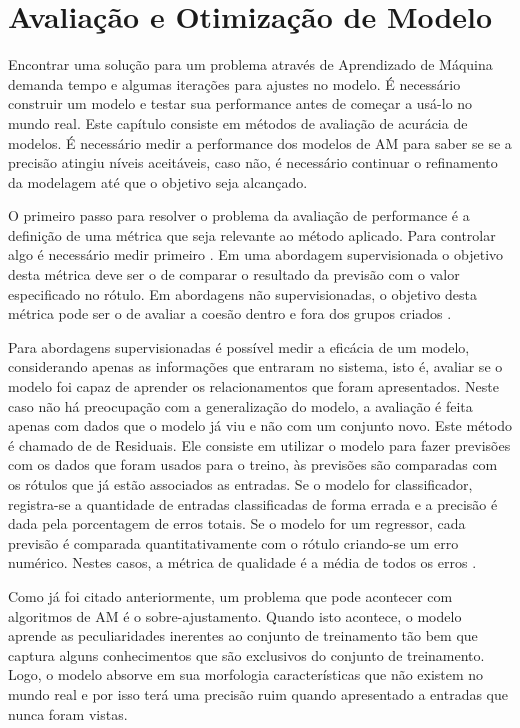 \section{Avaliação e Otimização de Modelo}

Encontrar uma solução para um problema através de Aprendizado de Máquina demanda tempo e algumas iterações para ajustes no modelo. É necessário construir um modelo e testar sua performance antes de começar a usá-lo no mundo real. Este capítulo consiste em métodos  de avaliação de acurácia de modelos. É necessário medir a performance dos modelos de AM para saber se se a precisão atingiu níveis aceitáveis, caso não, é necessário continuar o refinamento da modelagem até que o objetivo seja alcançado. 

O primeiro passo para resolver o problema da avaliação de performance é a definição de uma métrica que seja relevante ao método aplicado. Para controlar algo é necessário medir primeiro \cite{hjames2014}. Em uma abordagem supervisionada o objetivo desta métrica deve ser o de comparar o resultado da previsão com o valor especificado no rótulo. Em abordagens não supervisionadas, o objetivo desta métrica pode ser o de avaliar a coesão dentro e fora dos grupos criados \cite{scikit2014}. 

Para abordagens supervisionadas é possível medir a eficácia de um modelo, considerando apenas as informações que entraram no sistema, isto é, avaliar se o modelo foi capaz de aprender os relacionamentos que foram apresentados. Neste caso não há preocupação com a generalização do modelo, a avaliação é feita apenas com dados que o modelo já viu e não com um conjunto novo. Este método é chamado de de Residuais. Ele consiste em utilizar o modelo para fazer previsões com os dados que foram usados para o treino, às previsões são comparadas com os rótulos que já estão associados as entradas. Se o modelo for classificador, registra-se a quantidade de entradas classificadas de forma errada e a precisão é dada pela porcentagem de erros totais. Se o modelo for um regressor, cada previsão é comparada quantitativamente com o rótulo criando-se um erro numérico. Nestes casos, a métrica de qualidade é a média de todos os erros \cite{jeff1997}. 

Como já foi citado anteriormente, um problema que pode acontecer com algoritmos de AM é o sobre-ajustamento. Quando isto acontece, o modelo aprende as peculiaridades inerentes ao conjunto de treinamento tão bem que captura alguns conhecimentos que são exclusivos do conjunto de treinamento. 
Logo, o modelo absorve em sua morfologia características que não existem no mundo real e por isso terá uma precisão ruim quando apresentado a entradas que nunca foram vistas. 

